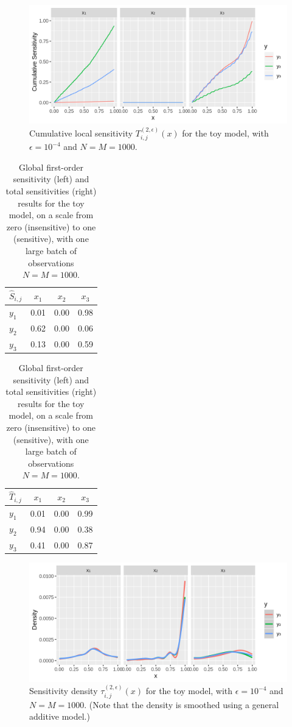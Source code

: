 \documentclass[12pt]{article}
\begin{document}
\begin{figure}
    \centering
    \includegraphics[width=1.00\linewidth]{figures/toy-tx.png}
    \caption{Cumulative local sensitivity $T_{i,j}^{(2,\epsilon)}(x)$ for the toy model, with $\epsilon = 10^{-4}$ and $N = M = 1000$.}
    \label{fig:toy-tx}
\end{figure}

\begin{table}
\centering
\begin{tabular}{l|c|c|c}
$\hat{S}_{i,j}$ & $x_1$ & $x_2$ & $x_3$ \\
\hline
$y_1$ & 0.01 & 0.00 & 0.98 \\
$y_2$ & 0.62 & 0.00 & 0.06 \\
$y_3$ & 0.13 & 0.00 & 0.59 \\
\end{tabular}
\quad
\begin{tabular}{l|c|c|c}
$\hat{T}_{i,j}$ & $x_1$ & $x_2$ & $x_3$ \\
\hline
$y_1$ & 0.01 & 0.00 & 0.99 \\
$y_2$ & 0.94 & 0.00 & 0.38 \\
$y_3$ & 0.41 & 0.00 & 0.87 \\
\end{tabular}
\caption{Global first-order sensitivity (left) and total sensitivities (right) results for the toy model, on a scale from zero (insensitive) to one (sensitive), with one large batch of observations $N = M = 1000$.}
\label{tab:toyglobal}
\end{table}

\begin{figure}
    \centering
    \includegraphics[width=1.00\linewidth]{figures/toy-tau.png}
    \caption{Sensitivity density $\tau_{i,j}^{(2,\epsilon)}(x)$ for the toy model, with $\epsilon = 10^{-4}$ and $N = M = 1000$. (Note that the density is smoothed using a general additive model.)}
    \label{fig:toy-tau}
\end{figure}
\end{document}
